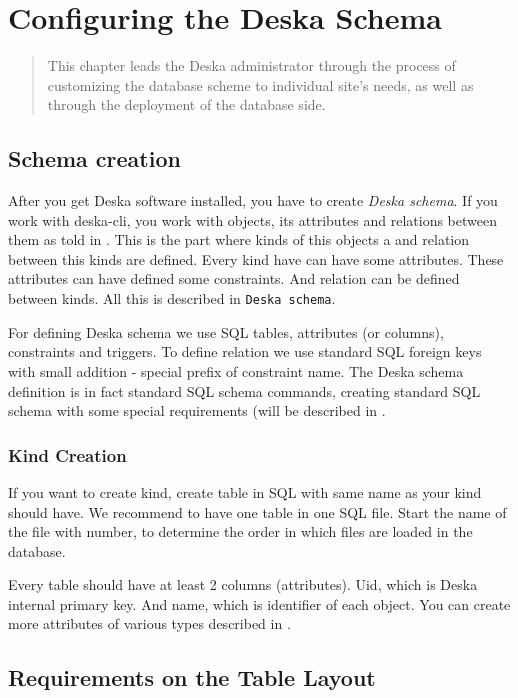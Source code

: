 \documentclass[deska]{subfiles}
\begin{document}
\chapter{Configuring the Deska Schema}
\label{sec:admin-dbscheme}

\begin{abstract}
This chapter leads the Deska administrator through the process of customizing the database scheme to individual site's
needs, as well as through the deployment of the database side.
\end{abstract}

\section{Schema creation}
After you get Deska software installed, you have to create {\em Deska schema}. If you work with
deska-cli, you work with objects, its attributes and relations between them as told in .
This is the part where kinds of this objects a and relation between this kinds are defined. Every kind have can have some attributes. These attributes can have defined some constraints. And relation can be defined between kinds.
All this is described in {\tt Deska schema}.

For defining Deska schema we use SQL tables, attributes (or columns), constraints and triggers.
To define relation we use standard SQL foreign keys with small addition - special prefix of constraint name.
The Deska schema definition is in fact standard SQL schema commands, creating standard SQL schema with some
special requirements (will be described in .

\subsection{Kind Creation}
If you want to create kind, create table in SQL with same name as your kind should have.
We recommend to have one table in one SQL file. Start the name of the file with number,
to determine the order in which files are loaded in the database.

Every table should have at least 2 columns (attributes). Uid, which is Deska internal primary key.
And name, which is identifier of each object. You can create more attributes of various types described in
.

\section{Requirements on the Table Layout}
\label{sec:db-scheme-req}
\end{document}
